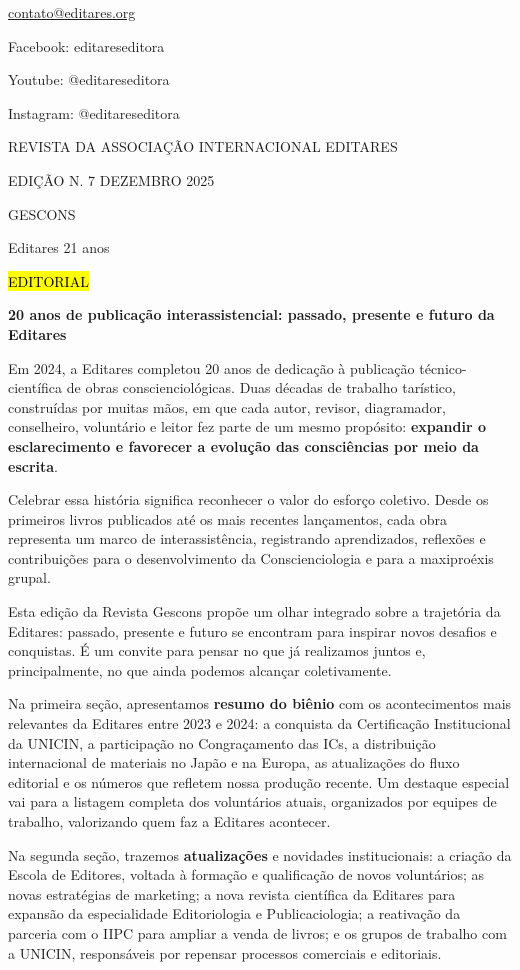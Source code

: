 \href{mailto:contato@editares.org}{\ul{contato@editares.org}}

Facebook: editareseditora

Youtube: @editareseditora

Instagram: @editareseditora

REVISTA DA ASSOCIAÇÃO INTERNACIONAL EDITARES

EDIÇÃO N. 7 \textbar{} DEZEMBRO \textbar{} 2025

GESCONS

Editares 21 anos

\hl{EDITORIAL}

\textbf{20 anos de publicação interassistencial: passado, presente e futuro da Editares}

Em 2024, a Editares completou 20 anos de dedicação à publicação técnico-científica de obras conscienciológicas. Duas décadas de trabalho tarístico, construídas por muitas mãos, em que cada autor, revisor, diagramador, conselheiro, voluntário e leitor fez parte de um mesmo propósito: \textbf{expandir o esclarecimento e favorecer a evolução das consciências por meio da escrita}.

Celebrar essa história significa reconhecer o valor do esforço coletivo. Desde os primeiros livros publicados até os mais recentes lançamentos, cada obra representa um marco de interassistência, registrando aprendizados, reflexões e contribuições para o desenvolvimento da Conscienciologia e para a maxiproéxis grupal.

Esta edição da Revista Gescons propõe um olhar integrado sobre a trajetória da Editares: passado, presente e futuro se encontram para inspirar novos desafios e conquistas. É um convite para pensar no que já realizamos juntos e, principalmente, no que ainda podemos alcançar coletivamente.

Na primeira seção, apresentamos \textbf{resumo do biênio} com os acontecimentos mais relevantes da Editares entre 2023 e 2024: a conquista da Certificação Institucional da UNICIN, a participação no Congraçamento das ICs, a distribuição internacional de materiais no Japão e na Europa, as atualizações do fluxo editorial e os números que refletem nossa produção recente. Um destaque especial vai para a listagem completa dos voluntários atuais, organizados por equipes de trabalho, valorizando quem faz a Editares acontecer.

Na segunda seção, trazemos \textbf{atualizações} e novidades institucionais: a criação da Escola de Editores, voltada à formação e qualificação de novos voluntários; as novas estratégias de marketing; a nova revista científica da Editares para expansão da especialidade Editoriologia e Publicaciologia; a reativação da parceria com o IIPC para ampliar a venda de livros; e os grupos de trabalho com a UNICIN, responsáveis por repensar processos comerciais e editoriais.

